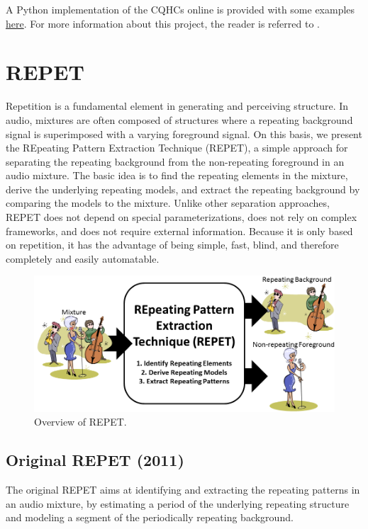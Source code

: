 \documentclass{article}
\begin{document}
A Python implementation of the CQHCs online is provided with some examples \href{https://github.com/zafarrafii/CQHC-Python}{here}. For more information about this project, the reader is referred to \cite{article_rafii_may2022}.


\section{REPET}
\label{sec:repet}

Repetition is a fundamental element in generating and perceiving structure. In audio, mixtures are often composed of structures where a repeating background signal is superimposed with a varying foreground signal. On this basis, we present the REpeating Pattern Extraction Technique (REPET), a simple approach for separating the repeating background from the non-repeating foreground in an audio mixture. The basic idea is to find the repeating elements in the mixture, derive the underlying repeating models, and extract the repeating background by comparing the models to the mixture. Unlike other separation approaches, REPET does not depend on special parameterizations, does not rely on complex frameworks, and does not require external information. Because it is only based on repetition, it has the advantage of being simple, fast, blind, and therefore completely and easily automatable.

\begin{figure}[!htb]
\centering
\includegraphics[width=\columnwidth]{Images/repet.png}
\caption{Overview of REPET.}
\label{fig:repet}
\end{figure}

\subsection{Original REPET (2011)}
\label{ssec:repet_original}

The original REPET aims at identifying and extracting the repeating patterns in an audio mixture, by estimating a period of the underlying repeating structure and modeling a segment of the periodically repeating background.
\end{document}
